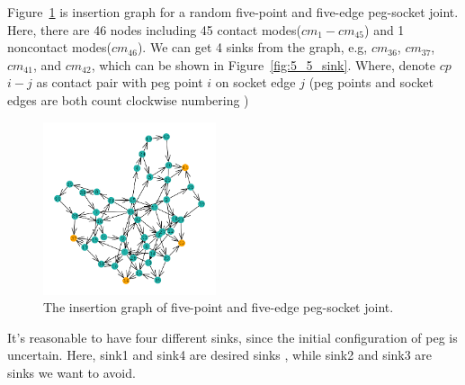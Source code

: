 Figure~\ref{fig:insetion_graph} is insertion graph for a random five-point and five-edge peg-socket joint.
Here, there are 46 nodes including 45 contact modes(${cm}_1-{cm}_{45}$) and 1 noncontact modes(${cm}_{46}$). We can get 4 sinks from the graph, e.g, ${cm}_{36}$, ${cm}_{37}$, ${cm}_{41}$, and ${cm}_{42}$, which can be shown in Figure~\ref{fig:5_5_sink}. Where, denote ${cp}$ ${i}-{j}$ as contact pair with peg point ${i}$ on socket edge ${j}$ (peg points and socket edges are both count clockwise numbering ) 
\begin{figure}
\begin{center}
\includegraphics[width=2in]{figures/insertion_graph.png}
\end{center}
\caption{The insertion graph of five-point and five-edge peg-socket joint. }
\label{fig:insetion_graph}
\end{figure}

It's reasonable to have four different sinks, since the initial configuration of peg is uncertain. Here, sink1 and sink4 are desired sinks , while sink2 and sink3 are sinks we want to avoid.


